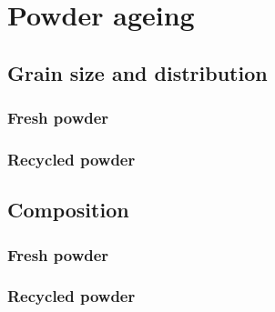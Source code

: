 \section{Powder ageing}

\subsection{Grain size and distribution}
\subsubsection{Fresh powder}

\subsubsection{Recycled powder}
\subsection{Composition}

\subsubsection{Fresh powder}

\subsubsection{Recycled powder}
 \begin{center}
\begin{table}[ht]
\noindent{}

\caption[Composition of recycled AlSi10Mg powder as a function of the date]{Composition of recycled AlSi10Mg powder as a function of the date}
\label{tab:compo}
\end{table}
 \end{center}

